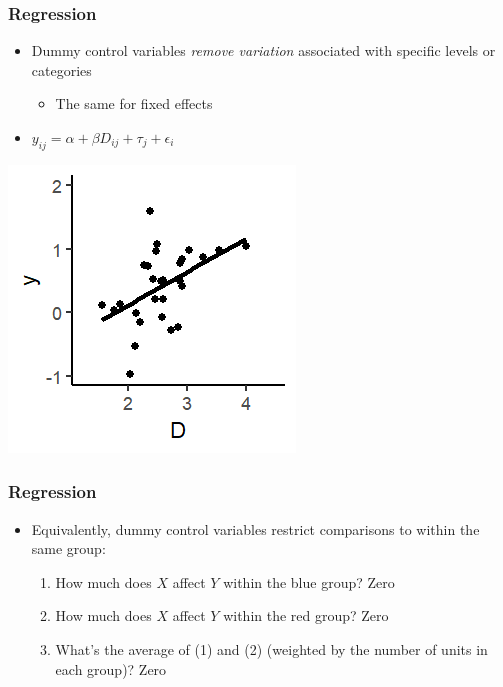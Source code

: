 \documentclass[xcolor=x11names,compress]{beamer}\usepackage[]{graphicx}\usepackage[]{color}
\makeatletter
\def\maxwidth{ %
  \ifdim\Gin@nat@width>\linewidth
    \linewidth
  \else
    \Gin@nat@width
  \fi
}
\newenvironment{knitrout}{}{} %
\renewcommand{\(}{\begin{columns}}
\renewcommand{\)}{\end{columns}}
\newcommand{\<}[1]{\begin{column}{#1}}
\renewcommand{\>}{\end{column}}
\makeatother
\begin{document}
\begin{frame}
\frametitle{Regression}
\begin{itemize}
\item Dummy control variables \textit{remove variation} associated with specific levels or categories
\begin{itemize}
\item The same for fixed effects
\end{itemize}
\item $y_{ij} = \alpha + \beta D_{ij} + \tau_j + \epsilon_i$
\end{itemize}
\begin{multicols}{2}
\begin{knitrout}
\color{fgcolor}
\includegraphics[width=\maxwidth]{figure/graph_ols_FE1-1} 

\end{knitrout}
\columnbreak
\end{multicols}
\end{frame}

\begin{frame}
\frametitle{Regression}
\begin{itemize}
\item Equivalently, dummy control variables restrict comparisons to within the same group:
\begin{enumerate}
\item How much does $X$ affect $Y$ within the blue group? Zero
\item How much does $X$ affect $Y$ within the red group? Zero
\item What's the average of (1) and (2) (weighted by the number of units in each group)? Zero
\end{enumerate}
\end{itemize}
\end{frame}
\end{document}
